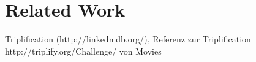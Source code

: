 \section{Related Work}
\label{sec_related_work}

Triplification (http://linkedmdb.org/), Referenz zur Triplification http://triplify.org/Challenge/ von Movies
